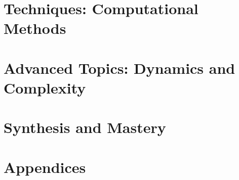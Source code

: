 \documentclass[12pt,a4paper,openany]{book}
\theoremstyle{definition}
\theoremstyle{remark}
\begin{document}
\part{Techniques: Computational Methods}



\part{Advanced Topics: Dynamics and Complexity}



\part{Synthesis and Mastery}



\backmatter

\part*{Appendices}




\end{document}

